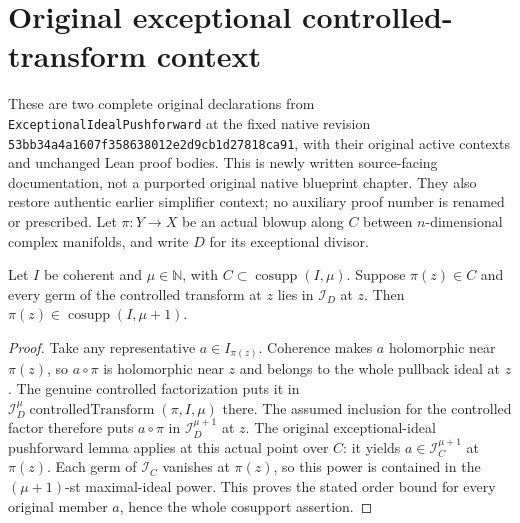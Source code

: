 \section{Original exceptional controlled-transform context}

These are two complete original declarations from
\texttt{ExceptionalIdealPushforward} at the fixed native revision
\texttt{53bb34a4a1607f358638012e2d9cb1d27818ca91}, with their original active
contexts and unchanged Lean proof bodies. This is newly written source-facing
documentation, not a purported original native blueprint chapter. They also
restore authentic earlier simplifier context; no auxiliary proof number is
renamed or prescribed. Let $\pi:Y\to X$ be an actual blowup along $C$ between
$n$-dimensional complex manifolds, and write $D$ for its exceptional divisor.

\begin{lemma}
\label{pub:controlled-exceptional-containment-higher-order}
\leanok
Let $I$ be coherent and $\mu\in\mathbb N$, with
$C\subset\operatorname{cosupp}(I,\mu)$. Suppose $\pi(z)\in C$ and every
germ of the controlled transform at $z$ lies in $\mathcal I_D$ at $z$. Then
$\pi(z)\in\operatorname{cosupp}(I,\mu+1)$.
\end{lemma}
\begin{proof}
Take any representative $a\in I_{\pi(z)}$. Coherence makes $a$ holomorphic
near $\pi(z)$, so $a\circ\pi$ is holomorphic near $z$ and belongs to the
whole pullback ideal at $z$. The genuine controlled factorization puts it in
$\mathcal I_D^\mu\operatorname{controlledTransform}(\pi,I,\mu)$ there.
The assumed inclusion for the controlled factor therefore puts $a\circ\pi$
in $\mathcal I_D^{\mu+1}$ at $z$.
The original exceptional-ideal pushforward lemma applies at this actual point
over $C$: it yields $a\in\mathcal I_C^{\mu+1}$ at $\pi(z)$. Each germ of
$\mathcal I_C$ vanishes at $\pi(z)$, so this power is contained in the
$(\mu+1)$-st maximal-ideal power. This proves the stated order bound for every
original member $a$, hence the whole cosupport assertion.
\end{proof}

